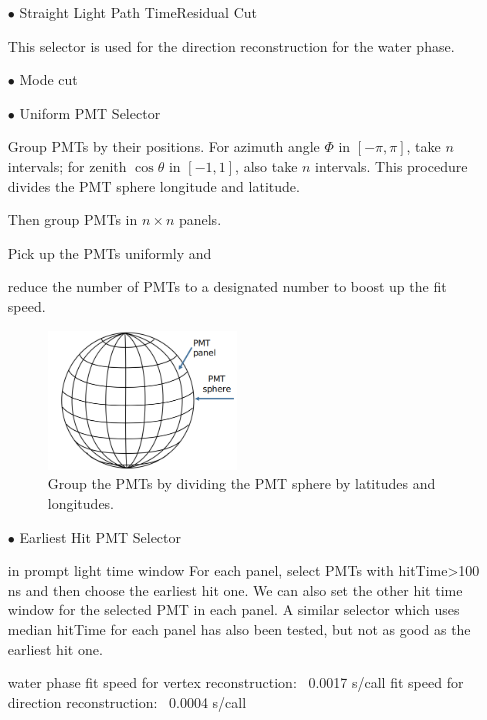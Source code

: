 \begin{itemize}
\item[$\bullet$] Straight Light Path TimeResidual Cut

This selector is used for the direction reconstruction for the water phase.



\item[$\bullet$] Mode cut



\item[$\bullet$] Uniform PMT Selector

Group PMTs by their positions. For azimuth angle $\Phi$ in $[-\pi, \pi]$,
take $n$ intervals; for zenith $\cos\theta$ in $[-1,1]$, also take $n$ intervals.
This procedure divides the PMT sphere longitude and latitude.

Then group PMTs in $n\times n$ panels.


Pick up the PMTs uniformly and

reduce the number of PMTs to a designated number to boost up the fit speed.

	\begin{figure}[!htb]
	\centering
	\includegraphics[width=5cm]{GroupPMTs.png}
	\caption{Group the PMTs by dividing the PMT sphere by latitudes and longitudes.}
	\label{GroupPMTs}
\end{figure}


\item[$\bullet$] Earliest Hit PMT Selector

in prompt light time window
For each panel, select PMTs with hitTime>100 ns and then
choose the earliest hit one. We can also set the other hit time
window for the selected PMT in each panel.
A similar selector which uses median hitTime for each panel has
also been tested, but not as good as the earliest hit one.



water phase
fit speed for vertex reconstruction: ~0.0017 s/call
fit speed for direction reconstruction: ~0.0004 s/call



\end{itemize}


